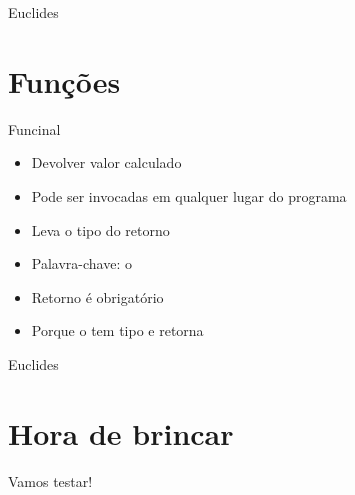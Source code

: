 \documentclass[14pt]{beamer}
\begin{document}
		\begin{frame}{Euclides}
			\presentationPause
		\end{frame}


	\section{Funções}
		\begin{frame}{Funcinal}
			\begin{itemize}
				\presentationPause\item Devolver valor calculado
				\presentationPause\item Pode ser invocadas em qualquer lugar do programa
				\presentationPause\item Leva o tipo do retorno
				\presentationPause\item Palavra-chave: \presentationPause o 
				\presentationPause\item Retorno é obrigatório
				\presentationPause\item Porque o  tem tipo  e retorna 
			\end{itemize}
			\presentationPause
		\end{frame}

		\begin{frame}{Euclides}
			\presentationPause
		\end{frame}


	\section{Hora de brincar}
		\begin{frame}
			\begin{center}\Huge
				Vamos testar!
			\end{center}
		\end{frame}
\end{document}
